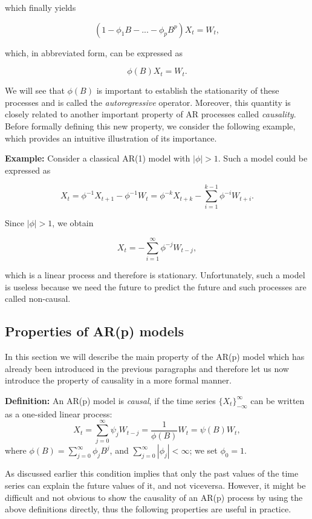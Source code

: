 \documentclass[]{book}
\theoremstyle{definition}
\theoremstyle{definition}
\theoremstyle{definition}
\theoremstyle{remark}
\begin{document}
{which finally yields

\[(1 - {\phi _1}B - ... - {\phi_p}B^p){X_t} = {W_t},\]

which, in abbreviated form, can be expressed as

\[\phi(B){X_t} = W_t.\]

We will see that \(\phi(B)\) is important to establish the stationarity
of these processes and is called the \emph{autoregressive} operator.
Moreover, this quantity is closely related to another important property
of AR processes called \emph{causality}. Before formally defining this
new property, we consider the following example, which provides an
intuitive illustration of its importance.

\textbf{Example:} Consider a classical AR(1) model with \(|\phi| > 1\).
Such a model could be expressed as

\[X_t = \phi^{-1} X_{t+1} - \phi^{-1} W_t = \phi^{-k} X_{t+k} - \sum_{i = 1}^{k-1} \phi^{-i} W_{t+i}.\]

Since \(|\phi| > 1\), we obtain

\[X_t = - \sum_{i = 1}^{\infty} \phi^{-j} W_{t-j},\]

which is a linear process and therefore is stationary. Unfortunately,
such a model is useless because we need the future to predict the future
and such processes are called non-causal.

\hypertarget{properties-of-arp-models}{%
\subsection{Properties of AR(p) models}\label{properties-of-arp-models}}

In this section we will describe the main property of the AR(p) model
which has already been introduced in the previous paragraphs and
therefore let us now introduce the property of causality in a more
formal manner.

\textbf{Definition:} An AR(p) model is \emph{causal}, if the time series
\(\{ X_t \}_{-\infty}^{\infty}\) can be written as a one-sided linear
process: \begin{equation}
    X_t = \sum_{j = 0}^{\infty} \psi_j W_{t-j} = \frac{1}{\phi(B)} W_t = \psi(B) W_t,
\label{eq:causal}
\end{equation} where \(\phi(B) = \sum_{j = 0}^{\infty} \phi_j B^j\), and
\(\sum_{j=0}^{\infty}|\phi_j| < \infty\); we set \(\phi_0 = 1\).

As discussed earlier this condition implies that only the past values of
the time series can explain the future values of it, and not viceversa.
However, it might be difficult and not obvious to show the causality of
an AR(p) process by using the above definitions directly, thus the
following properties are useful in practice.

}
\end{document}
